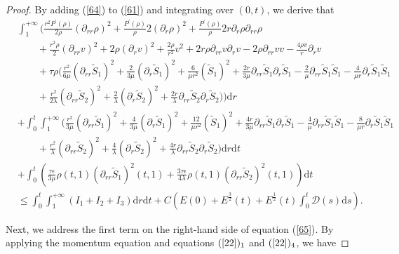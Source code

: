 \documentclass[10pt,reqno]{amsart}
\numberwithin{equation}{section}
\begin{document}
\begin{proof}
		By adding (\ref{64}) to (\ref{61}) and integrating over $(0,t)$, we derive that
		\begin{equation}\label{65}
			\begin{aligned}
				&\int_{1}^{+\infty}\bigg(\frac{r^2 P^{\prime}(\rho)}{2\rho} \left(\partial_{rr} \rho\right)^2+\frac{ P^{\prime}(\rho)}{\rho}2(\partial_{r}\rho)^2+\frac{P^{\prime}(\rho)}{\rho}2r\partial_{r}\rho\partial_{rr}\rho\\%
				&\quad\quad
				+\frac{r^2\rho}{2} (\partial_{rr}v)^2+2\rho(\partial_{r}v)^2+\frac{2\rho}{r^2}v^2+2r\rho\partial_{rr}v\partial_{r}v-2\rho\partial_{rr}v v-\frac{4\rho v}{r}\partial_{r}v\\%
				&\quad\quad
				+\tau\rho(\frac{r^2}{6\mu}(\partial_{rr}\tilde{S}_1)^2+\frac{2}{3\mu}(\partial_{r}\tilde{S}_1)^2+\frac{6}{\mu r^2}(\tilde{S}_1)^2 +\frac{2r}{3\mu}\partial_{rr}\tilde{S}_1 \partial_{r}\tilde{S}_1-\frac{2}{\mu}\partial_{rr}\tilde{S}_1\tilde{S}_1-\frac{4}{\mu r}\partial_{r}\tilde{S}_1 \tilde{S}_1\\%
				&\quad\quad
				+\frac{r^2}{2\lambda}(\partial_{rr} \tilde{S}_2)^2+\frac{2}{\lambda}(\partial_{r} \tilde{S}_2)^2+\frac{2r}{\lambda}\partial_{rr} \tilde{S}_2\partial_{r} \tilde{S}_2)\bigg)\mathrm{d}r
				\\%
				&+\int_{0}^{t}\int_{1}^{+\infty}\bigg(\frac{r^2}{3\mu}(\partial_{rr}\tilde{S}_1)^2+\frac{4}{3\mu}(\partial_{r}\tilde{S}_1)^2+\frac{12}{\mu r^2}(\tilde{S}_1)^2 +\frac{4r}{3\mu}\partial_{rr}\tilde{S}_1 \partial_{r}\tilde{S}_1-\frac{4}{\mu}\partial_{rr}\tilde{S}_1\tilde{S}_1-\frac{8}{\mu r}\partial_{r}\tilde{S}_1 \tilde{S}_1\\
				&\quad\quad
				+\frac{r^2}{\lambda}(\partial_{rr}\tilde{S}_2)^2+\frac{4}{\lambda}(\partial_{r}  \tilde{S}_2)^2+\frac{4r}{\lambda}\partial_{rr} \tilde{S}_2\partial_{r} \tilde{S}_2\bigg)\mathrm{d}r\mathrm{d}t\\
				&+\int_{0}^{t}\left(\frac{\tau\epsilon}{3\mu}\rho(t,1)(\partial_{rr}\tilde{S}_1)^2(t,1)
				+\frac{3\tau\epsilon}{4\lambda}\rho(t,1)(\partial_{rr}\tilde{S}_2)^2(t,1)\right)\mathrm{d}t\\ 
				&\leq \int_{0}^{t}\int_{1}^{+\infty} \left(I_1+I_2+I_3\right)\mathrm{d}r\mathrm{d}t+C \left(E(0)+E^{\frac{3}{2}}(t)+E^{\frac{1}{2}}(t) \int_{0}^{t}\mathcal{D}(s)\mathrm{d}s
				\right).
			\end{aligned}
		\end{equation}
		
		Next, we address the first term on the right-hand side of equation (\ref{65}). By applying the momentum equation and equations $(\ref{22})_1$ and $(\ref{22})_4$, we have
		

\end{proof}
\end{document}
